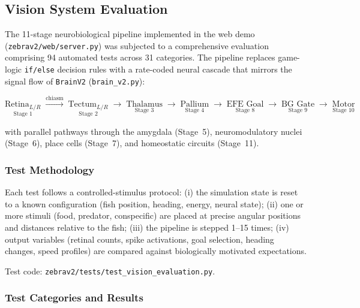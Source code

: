 \documentclass[11pt,a4paper]{article}
\begin{document}
\subsection{Vision System Evaluation}\label{sec:vision_eval}

The 11-stage neurobiological pipeline implemented in the web demo
(\texttt{zebrav2/web/server.py}) was subjected to a comprehensive evaluation
comprising 94 automated tests across 31 categories. The pipeline replaces
game-logic \texttt{if/else} decision rules with a rate-coded neural cascade
that mirrors the signal flow of \texttt{BrainV2} (\texttt{brain\_v2.py}):

\begin{equation}\label{eq:vision_pipeline}
\underset{\text{Stage 1}}{\text{Retina}_{L/R}}
\;\xrightarrow{\text{chiasm}}\;
\underset{\text{Stage 2}}{\text{Tectum}_{L/R}}
\;\to\;
\underset{\text{Stage 3}}{\text{Thalamus}}
\;\to\;
\underset{\text{Stage 4}}{\text{Pallium}}
\;\to\;
\underset{\text{Stage 8}}{\text{EFE Goal}}
\;\to\;
\underset{\text{Stage 9}}{\text{BG Gate}}
\;\to\;
\underset{\text{Stage 10}}{\text{Motor}}
\end{equation}

\noindent with parallel pathways through the amygdala (Stage~5),
neuromodulatory nuclei (Stage~6), place cells (Stage~7), and
homeostatic circuits (Stage~11).

\subsubsection{Test Methodology}

Each test follows a controlled-stimulus protocol:
(i) the simulation state is reset to a known configuration
(fish position, heading, energy, neural state);
(ii) one or more stimuli (food, predator, conspecific) are placed at
precise angular positions and distances relative to the fish;
(iii) the pipeline is stepped 1--15 times;
(iv) output variables (retinal counts, spike activations, goal selection,
heading changes, speed profiles) are compared against biologically
motivated expectations.

Test code: \texttt{zebrav2/tests/test\_vision\_evaluation.py}.

\subsubsection{Test Categories and Results}
\end{document}
